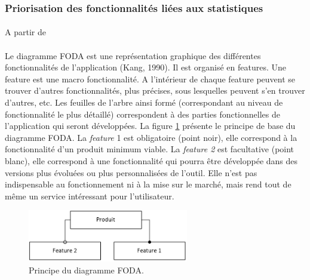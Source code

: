		\subsubsection{Priorisation des fonctionnalités liées aux statistiques}
			\paragraph{}%
			A partir de 
			
			\paragraph{}%
			Le diagramme FODA est une représentation graphique des différentes
			fonctionnalités de l’application (Kang, 1990). Il est organisé en features.
			Une feature est une macro fonctionnalité. A l’intérieur de chaque feature
			peuvent se trouver d’autres fonctionnalités, plus précises, sous lesquelles
			peuvent s’en trouver d’autres, etc. Les feuilles de l’arbre ainsi formé
			(correspondant au niveau de fonctionnalité le plus détaillé) correspondent à
			des parties fonctionnelles de l’application qui seront développées.\newline
			La figure \ref{foda_legende} présente le principe de base du diagramme FODA.
			La \textit{feature} 1 est obligatoire (point noir), elle correspond à la
			fonctionnalité d'un produit minimum viable. La \textit{feature 2} est
			facultative (point blanc), elle correspond à une fonctionnalité qui pourra être
			développée dans des versions plus évoluées ou plus personnalisées de
			l’outil. Elle n’est pas indispensable au fonctionnement ni à la mise sur le
			marché, mais rend tout de même un service intéressant pour l'utilisateur.
			\begin{figure}[H]%
				\centering
				\includegraphics[width=7cm]{../img/foda_legende.png}
				\caption{\label{foda_legende} Principe du diagramme FODA.}
			\end{figure}
			
			\paragraph{}%
	

